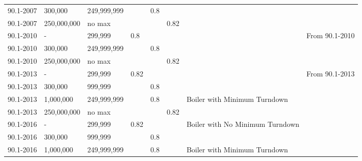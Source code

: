 \begin{table}[h!]
\begin{tabular}{|p{0.5in}|p{0.5in}|p{1.7cm}|p{0.5in}|p{0.5in}|p{0.5in}|p{1in}|p{0.5in}|}
90.1-2007           & 300,000     & 249,999,999   &      & 0.8  &      &                                                     &                                   \\ \cline{1-6}
90.1-2007           & 250,000,000 & no max &      &      & 0.82 &                                                     &                                   \\ \cline{1-6} \cline{8-8} 
90.1-2010           & -           & 299,999       & 0.8  &      &      &                                                     & \multirow{3}{*}{\parbox{0.5in}{From   90.1-2010}} \\ \cline{1-6}
90.1-2010           & 300,000     & 249,999,999   &      & 0.8  &      &                                                     &                                   \\ \cline{1-6}
90.1-2010           & 250,000,000 & no max &      &      & 0.82 &                                                     &                                   \\ \cline{1-6} \cline{8-8} 
90.1-2013           & -           & 299,999       & 0.82 &      &      &                                                     & \multirow{8}{*}{\parbox{0.5in}{From   90.1-2013}} \\ \cline{1-6}
90.1-2013           & 300,000     & 999,999       &      & 0.8  &      &                                                     &                                   \\ \cline{1-7}
90.1-2013           & 1,000,000   & 249,999,999   &      & 0.8  &      & \multirow{2}{*}{\parbox{1in}{Boiler with Minimum Turndown}}     &                                   \\ \cline{1-6}
90.1-2013           & 250,000,000 & no max &      &      & 0.82 &                                                     &                                   \\ \cline{1-7}
90.1-2016           & -           & 299,999       & 0.82 &      &      & \multirow{2}{*}{\parbox{1in}{Boiler with No Minimum Turndown}}  & \multirow{4}{*}{\parbox{0.5in}{From   90.1-2016}} \\ \cline{1-6}
90.1-2016           & 300,000     & 999,999       &      & 0.8  &      &                                                     &                                   \\ \cline{1-7}
90.1-2016           & 1,000,000   & 249,999,999   &      & 0.8  &      & \multirow{2}{*}{\parbox{1in}{Boiler with Minimum Turndown}}     &                                   \\ \cline{1-6}

\end{tabular}
\end{table}
